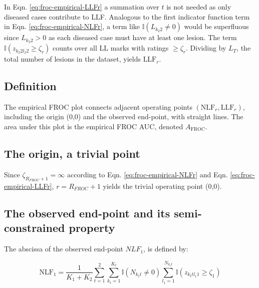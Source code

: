 \documentclass[
]{book}
\begin{document}
In Eqn. \eqref{eq:froc-empirical-LLFr} a summation over \(t\) is not needed as only diseased cases contribute to LLF. Analogous to the first indicator function term in Eqn. \eqref{eq:froc-empirical-NLFr}, a term like \(\mathbb{I} \left ( L_{k_2 2} \neq 0 \right )\) would be superfluous since \(L_{k_2 2} > 0\) as each diseased case must have at least one lesion. The term \(\mathbb{I} \left ( z_{k_2 2 l_2 2} \geq \zeta_r \right )\) counts over all LL marks with ratings \(\geq \zeta_r\). Dividing by \(L_T\), the total number of lesions in the dataset, yields \(\text{LLF}_r\).

\hypertarget{froc-empirical-definition-auc-FROC}{%
\subsection{Definition}\label{froc-empirical-definition-auc-FROC}}

The empirical FROC plot connects adjacent operating points \(\left (\text{NLF}_r, \text{LLF}_r \right )\), including the origin (0,0) and the observed end-point, with straight lines. The area under this plot is the empirical FROC AUC, denoted \(A_{\text{FROC}}\).

\hypertarget{froc-empirical-origin-trivial-point}{%
\subsection{The origin, a trivial point}\label{froc-empirical-origin-trivial-point}}

Since \(\zeta_{R_{FROC}+1} = \infty\) according to Eqn. \eqref{eq:froc-empirical-NLFr} and Eqn. \eqref{eq:froc-empirical-LLFr}, \(r = R_{FROC}+1\) yields the trivial operating point (0,0).

\hypertarget{froc-empirical-end-point}{%
\subsection{The observed end-point and its semi-constrained property}\label{froc-empirical-end-point}}

The abscissa of the observed end-point \(NLF_1\), is defined by:

\begin{equation}
\text{NLF}_1 = \frac{1}{K_1+K_2} \sum_{t=1}^{2} \sum_{k_t=1}^{K_t} \mathbb{I} \left ( N_{k_t t} \neq 0 \right ) \sum_{l_1=1}^{N_{k_t t}} \mathbb{I} \left ( z_{k_t t l_1 1} \geq \zeta_1 \right ) 
\label{eq:froc-empirical-NLF11}
\end{equation}
\end{document}
